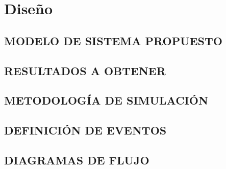
\chapter{Diseño} %

\label{Chapter5} %



\section{MODELO DE SISTEMA PROPUESTO}


\section{RESULTADOS A OBTENER}


\section{METODOLOGÍA DE SIMULACIÓN}


\section{DEFINICIÓN DE EVENTOS}


\section{DIAGRAMAS DE FLUJO}

